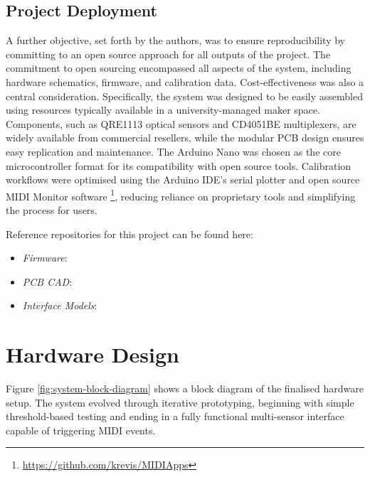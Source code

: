 \subsection{Project Deployment}

A further objective, set forth by the authors, was to ensure reproducibility by
committing to an open source approach for all outputs of the project. The
commitment to open sourcing encompassed all aspects of the system, including
hardware schematics, firmware, and calibration data. Cost-effectiveness was also
a central consideration.
Specifically, the system was designed to be easily assembled using resources
typically available in a university-managed maker space. Components, such as
QRE1113 optical sensors and CD4051BE multiplexers, are widely available from
commercial resellers, while the modular PCB design ensures easy replication and
maintenance. The Arduino Nano was chosen as the core microcontroller format for
its compatibility with open source tools. Calibration workflows were optimised
using the Arduino IDE’s serial plotter and open source MIDI Monitor software
\footnote{\url{https://github.com/krevis/MIDIApps}}, reducing reliance on
proprietary tools and simplifying the process for users.

\begin{anonsuppress}
  Reference repositories for this project can be found here:

  \begin{itemize}
    \item
      \emph{Firmware}:
    \item
      \emph{PCB CAD}:
    \item
      \emph{Interface Models}:
  \end{itemize}
\end{anonsuppress}

\section{Hardware Design}\label{hardware-design}

Figure \ref{fig:system-block-diagram} shows a block diagram of the finalised
hardware setup. The system evolved through iterative prototyping, beginning with
simple threshold-based testing and ending in a fully functional multi-sensor
interface capable of triggering MIDI events.

